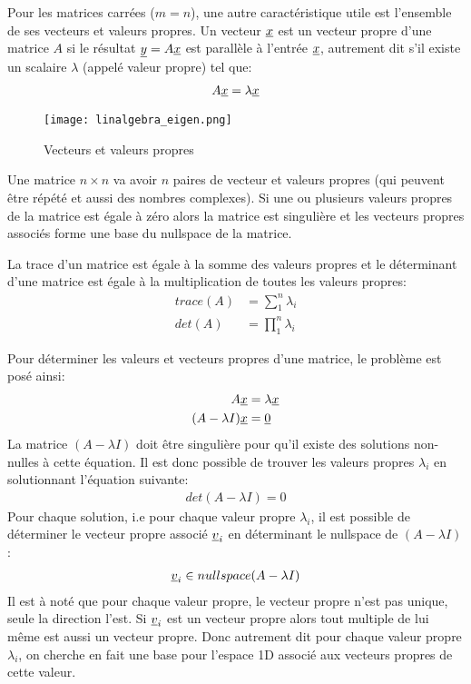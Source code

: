 Pour les matrices carrées ($m=n$), une autre caractéristique utile est l'ensemble de ses vecteurs et valeurs propres. Un vecteur $\underline{x}$ est un vecteur propre d'une matrice $A$ si le résultat $\underline{y} = A \underline{x}$ est parallèle à l'entrée $\underline{x}$, autrement dit s'il existe un scalaire $\lambda$ (appelé valeur propre) tel que:
\begin{align}
A \underline{x} = \lambda  \underline{x}
\end{align}

\begin{figure}[H]
	\centering
		\texttt{[image: linalgebra\_eigen.png]}
	\caption{Vecteurs et valeurs propres}
	\label{fig:eigen}
\end{figure}

Une matrice $n \times n$ va avoir $n$ paires de vecteur et valeurs propres (qui peuvent être répété et aussi des nombres complexes). Si une ou plusieurs valeurs propres de la matrice est égale à zéro alors la matrice est singulière et les vecteurs propres associés forme une base du nullspace de la matrice. 

La trace d'un matrice est égale à la somme des valeurs propres et le déterminant d'une matrice est égale à la multiplication de toutes les valeurs propres:
\begin{align}
trace(A) &= \sum_1^n{ \lambda_i } \\
det(A)   &= \prod_1^n{ \lambda_i }
\end{align}

Pour déterminer les valeurs et vecteurs propres d'une matrice, le problème est posé ainsi:
\begin{align}
A \underline{x} &= \lambda  \underline{x} \\
(A - \lambda I) \underline{x} &= \underline{0}
\end{align}
La matrice $(A - \lambda I)$ doit être singulière pour qu'il existe des solutions non-nulles à cette équation. Il est donc possible de trouver les valeurs propres $\lambda_i$ en solutionnant l'équation suivante:
\begin{align}
det(A - \lambda I) = 0
\end{align}
Pour chaque solution, i.e pour chaque valeur propre $\lambda_i$, il est possible de déterminer le vecteur propre associé $\underline{v}_i$ en déterminant le nullspace de $(A - \lambda I)$:
\begin{align}
\underline{v}_i \in nullspace(A - \lambda I)
\end{align}
Il est à noté que pour chaque valeur propre, le vecteur propre n'est pas unique, seule la direction l'est. Si $\underline{v}_i$ est un vecteur propre alors tout multiple de lui même est aussi un vecteur propre. Donc autrement dit pour chaque valeur propre $\lambda_i$, on cherche en fait une base pour l'espace 1D associé aux vecteurs propres de cette valeur.



